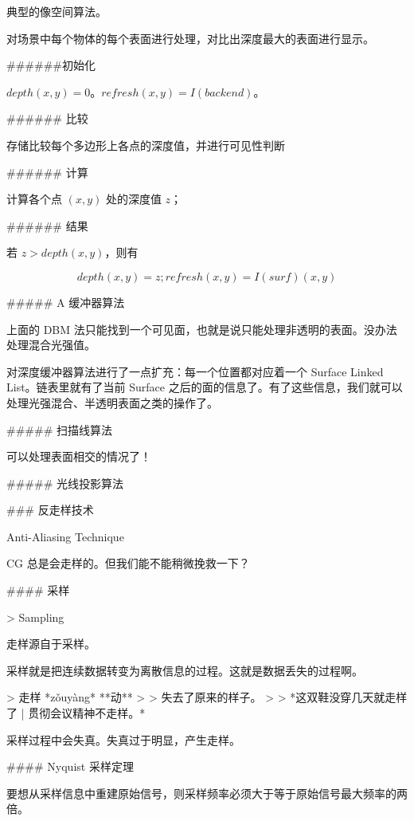 \documentclass[
]{article}
\newenvironment{Shaded}{}{}
\newcommand{\DataTypeTok}[1]{\textcolor[rgb]{0.56,0.13,0.00}{#1}}
\newcommand{\FunctionTok}[1]{\textcolor[rgb]{0.02,0.16,0.49}{#1}}
\newcommand{\NormalTok}[1]{#1}
\begin{document}
\begin{Shaded}
\begin{Highlighting}[]
\NormalTok{典型的像空间算法。}

\NormalTok{对场景中每个物体的每个表面进行处理，对比出深度最大的表面进行显示。}

\NormalTok{######初始化}

\NormalTok{$depth(x, y) = 0$。$refresh(x, y) = I(backend)$。}

\FunctionTok{###### 比较}

\NormalTok{存储比较每个多边形上各点的深度值，并进行可见性判断}

\FunctionTok{###### 计算}

\NormalTok{计算各个点 $(x, y)$ 处的深度值 $z$；}

\FunctionTok{###### 结果}

\NormalTok{若 $z > depth(x, y)$，则有}

\NormalTok{$$depth(x, y) = z; refresh(x, y) = I(surf)(x, y)$$}

\FunctionTok{##### A 缓冲器算法}

\NormalTok{上面的 DBM 法只能找到一个可见面，也就是说只能处理非透明的表面。没办法处理混合光强值。}

\NormalTok{对深度缓冲器算法进行了一点扩充：每一个位置都对应着一个 Surface Linked List。链表里就有了当前 Surface 之后的面的信息了。有了这些信息，我们就可以处理光强混合、半透明表面之类的操作了。}

\FunctionTok{##### 扫描线算法}

\NormalTok{可以处理表面相交的情况了！}

\FunctionTok{##### 光线投影算法}

\FunctionTok{### 反走样技术}

\NormalTok{Anti-Aliasing Technique}

\NormalTok{CG 总是会走样的。但我们能不能稍微挽救一下？}

\FunctionTok{#### 采样}

\NormalTok{>}\DataTypeTok{ Sampling}

\NormalTok{走样源自于采样。}

\NormalTok{采样就是把连续数据转变为离散信息的过程。这就是数据丢失的过程啊。}

\NormalTok{>}\DataTypeTok{ 走样 *zǒuyàng* **动**}
\DataTypeTok{>}
\DataTypeTok{> 失去了原来的样子。}
\DataTypeTok{>}
\DataTypeTok{> *这双鞋没穿几天就走样了 | 贯彻会议精神不走样。*}

\NormalTok{采样过程中会失真。失真过于明显，产生走样。}

\FunctionTok{#### Nyquist 采样定理}

\NormalTok{要想从采样信息中重建原始信号，则采样频率必须大于等于原始信号最大频率的两倍。}


\end{Highlighting}
\end{Shaded}
\end{document}

